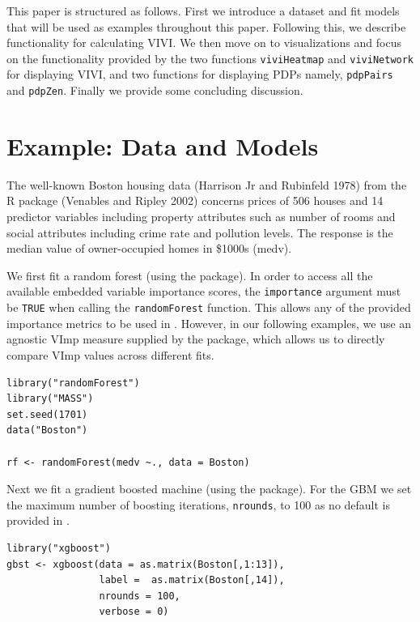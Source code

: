 This paper is structured as follows. First we introduce a dataset and fit models that will be used as examples throughout this paper. Following this, we describe  functionality for calculating VIVI. We then move on to visualizations and focus on the functionality provided by the two functions \texttt{viviHeatmap} and \texttt{viviNetwork} for displaying VIVI, and two functions for displaying PDPs namely, \texttt{pdpPairs} and \texttt{pdpZen}. Finally we provide some concluding discussion.

\hypertarget{datamodel}{%
\section{Example: Data and Models}\label{datamodel}}

The well-known Boston housing data (Harrison Jr and Rubinfeld 1978) from the R package  (Venables and Ripley 2002) concerns prices of 506 houses and 14 predictor variables including property attributes such as number of rooms and social attributes including crime rate and pollution levels. The response is the median value of owner-occupied homes in \$1000s (medv).

We first fit a random forest (using the  package). In order to access all the available embedded variable importance scores, the \texttt{importance} argument must be \texttt{TRUE} when calling the \texttt{randomForest} function. This allows any of the provided importance metrics to be used in . However, in our following examples, we use an agnostic VImp measure supplied by the  package, which allows us to directly compare VImp values across different fits.

\begin{verbatim}
library("randomForest") 
library("MASS")
set.seed(1701)  
data("Boston")

rf <- randomForest(medv ~., data = Boston)
\end{verbatim}

Next we fit a gradient boosted machine (using the  package). For the GBM we set the maximum number of boosting iterations, \texttt{nrounds}, to 100 as no default is provided in .

\begin{verbatim}
library("xgboost") 
gbst <- xgboost(data = as.matrix(Boston[,1:13]), 
                label =  as.matrix(Boston[,14]),
                nrounds = 100,
                verbose = 0)
\end{verbatim}

